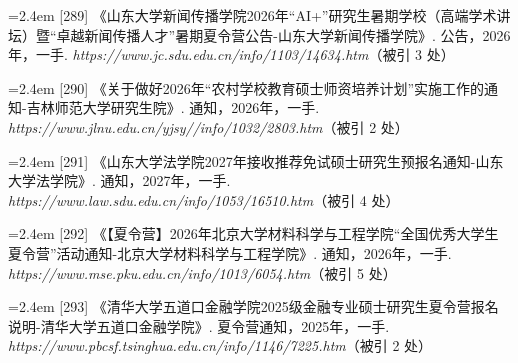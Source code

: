 {\nopagebreak\vspace{1pt}
\noindent\hangindent=2.4em \label{src:S0376}{\color{cAccent}[289]} 《山东大学新闻传播学院2026年“AI+”研究生暑期学校（高端学术讲坛）暨“卓越新闻传播人才”暑期夏令营公告-山东大学新闻传播学院》. 公告，2026年，一手. \textit{https://www.jc.sdu.edu.cn/info/1103/14634.htm}（被引 3 处）\par
\vspace{0.6pt}
\vspace{3.5pt}\par
\nopagebreak\vspace{1pt}
\noindent\hangindent=2.4em \label{src:S0377}{\color{cAccent}[290]} 《关于做好2026年“农村学校教育硕士师资培养计划”实施工作的通知-吉林师范大学研究生院》. 通知，2026年，一手. \textit{https://www.jlnu.edu.cn/yjsy//info/1032/2803.htm}（被引 2 处）\par
\vspace{0.6pt}
\vspace{3.5pt}\par
\nopagebreak\vspace{1pt}
\noindent\hangindent=2.4em \label{src:S0378}{\color{cAccent}[291]} 《山东大学法学院2027年接收推荐免试硕士研究生预报名通知-山东大学法学院》. 通知，2027年，一手. \textit{https://www.law.sdu.edu.cn/info/1053/16510.htm}（被引 4 处）\par
\vspace{0.6pt}
\vspace{3.5pt}\par
\nopagebreak\vspace{1pt}
\noindent\hangindent=2.4em \label{src:S0380}{\color{cAccent}[292]} 《【夏令营】2026年北京大学材料科学与工程学院“全国优秀大学生夏令营”活动通知-北京大学材料科学与工程学院》. 通知，2026年，一手. \textit{https://www.mse.pku.edu.cn/info/1013/6054.htm}（被引 5 处）\par
\vspace{0.6pt}
\vspace{3.5pt}\par
\nopagebreak\vspace{1pt}
\noindent\hangindent=2.4em \label{src:S0382}{\color{cAccent}[293]} 《清华大学五道口金融学院2025级金融专业硕士研究生夏令营报名说明-清华大学五道口金融学院》. 夏令营通知，2025年，一手. \textit{https://www.pbcsf.tsinghua.edu.cn/info/1146/7225.htm}（被引 2 处）\par
}
